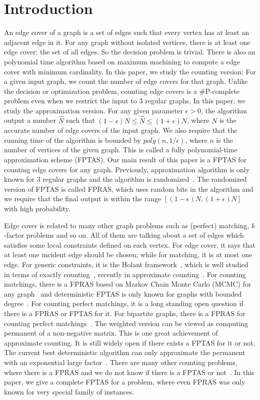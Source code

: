 \section{Introduction}
An edge cover of a graph is a set of edges such that every vertex has at least an adjacent edge in it.
 For any graph without isolated vertices, there is at least one edge cover: the set of all edges. So the decision problem is trivial. There is also an polynomial time algorithm based on maximum machining to compute a edge cover with minimum cardinality.     In this paper, we study the counting version: 
 For a given input graph, we count the number of edge covers for that graph. Unlike the decision or optimization problem, counting edge covers is a \#P-complete problem even when we restrict the input to 3 regular graphs. In this paper, we study the approximation version. For any given parameter $\epsilon>0$, the algorithm output a number $\hat{N}$ such that $(1-\epsilon) N\leq \hat{N} \leq (1+\epsilon) N$, where $N$ is the accurate number of edge covers of the input graph. We also require that the running time of the algorithm is bounded by $poly(n,1/\epsilon)$, where $n$ is the number of vertices of the given graph. This is called a fully polynomial-time approximation scheme (FPTAS). Our main result of this paper is a FPTAS for counting edge covers for any graph. Previously, approximation algorithm is only known for 3 regular graphs and the algorithm is randomized~\cite{MFCS09}. The randomized version of FPTAS is called FPRAS, which uses random bits in the algorithm and we require that the final output is within the range $[(1-\epsilon) N, (1+\epsilon) N]$ with high probability.

Edge cover is related to many other graph problems such as (perfect) matching, $k$-factor problems and so on. All of them are talking about a set of edges which satisfies some local constraints defined on each vertex. For edge cover, it says that at least one incident edge should be chosen; while for matching, it is at most one edge. For generic constraints, it is the Holant framework~\cite{STOC09,holant}, which is well studied in terms of exactly counting~\cite{holant,HuangL12,CaiGW13}, recently in approximate counting~\cite{McQuillan2013,fibo-approx}. For counting matchings, there is a FPRAS based on Markov Chain Monte Carlo (MCMC) for any graph~\cite{} and deterministic FPTAS is only known for graphs with bounded degree~\cite{BGKNT07}. For counting perfect matchings, it is a long standing open question if there is a FPRAS or FPTAS for it. For bipartite graphs, there is a FPRAS for counting perfect matchings~\cite{}. The weighted version can be viewed as  computing permanent of a non-negative matrix. This is one great achievement of approximate counting. It is still widely open if there exists a FPTAS for it or not. The current best deterministic algorithm can only approximate the permanent with an exponential large factor~\cite{}. There are many other counting problems, where there is a FPRAS and we do not know if there is a FPTAS or not~\cite{}. In this paper, we give a complete FPTAS for a problem, where even FPRAS was only known for very special family of instances.

